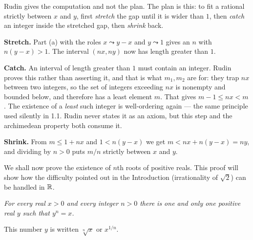 \documentclass[11pt,twoside]{article}
\begin{document}
\begin{unpack}
Rudin gives the computation and not the plan. The plan is this: to fit a
rational strictly between $x$ and $y$, first \emph{stretch} the gap until it is
wider than $1$, then \emph{catch} an integer inside the stretched gap, then
\emph{shrink} back.

\smallskip
\textbf{Stretch.} Part (a) with the roles $x \leadsto y-x$ and $y \leadsto 1$
gives an $n$ with $n(y-x) > 1$. The interval $(nx, ny)$ now has length greater
than $1$.

\smallskip
\textbf{Catch.} An interval of length greater than $1$ must contain an integer.
Rudin proves this rather than asserting it, and that is what $m_1, m_2$ are for:
they trap $nx$ between two integers, so the set of integers exceeding $nx$ is
nonempty and bounded below, and therefore has a least element $m$. That gives
$m-1 \le nx < m$. The existence of a \emph{least} such integer is well-ordering
again --- the same principle used silently in 1.1. Rudin never states it as an
axiom, but this step and the archimedean property both consume it.

\smallskip
\textbf{Shrink.} From $m \le 1 + nx$ and $1 < n(y-x)$ we get
$m < nx + n(y-x) = ny$, and dividing by $n > 0$ puts $m/n$ strictly between $x$
and $y$.
\end{unpack}

\medskip
\noindent
We shall now prove the existence of $n$th roots of positive reals. This proof
will show how the difficulty pointed out in the Introduction (irrationality of
$\sqrt 2$) can be handled in $\mathbb{R}$.

\emph{For every real $x>0$ and every integer $n>0$ there is one and only one
positive real $y$ such that $y^n = x$.}

This number $y$ is written $\sqrt[n]{x}$ or $x^{1/n}$.
\end{document}
